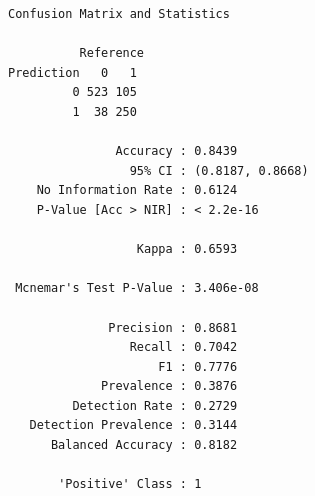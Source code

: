 \documentclass[
  letterpaper,
  DIV=11,
  numbers=noendperiod]{scrartcl}
\newenvironment{Shaded}{\begin{snugshade}}{\end{snugshade}}
\newcommand{\AttributeTok}[1]{\textcolor[rgb]{0.40,0.45,0.13}{#1}}
\newcommand{\FunctionTok}[1]{\textcolor[rgb]{0.28,0.35,0.67}{#1}}
\newcommand{\NormalTok}[1]{\textcolor[rgb]{0.00,0.23,0.31}{#1}}
\newcommand{\OtherTok}[1]{\textcolor[rgb]{0.00,0.23,0.31}{#1}}
\newcommand{\SpecialCharTok}[1]{\textcolor[rgb]{0.37,0.37,0.37}{#1}}
\newcommand{\StringTok}[1]{\textcolor[rgb]{0.13,0.47,0.30}{#1}}
\begin{document}
\begin{verbatim}
Confusion Matrix and Statistics

          Reference
Prediction   0   1
         0 523 105
         1  38 250
                                          
               Accuracy : 0.8439          
                 95% CI : (0.8187, 0.8668)
    No Information Rate : 0.6124          
    P-Value [Acc > NIR] : < 2.2e-16       
                                          
                  Kappa : 0.6593          
                                          
 Mcnemar's Test P-Value : 3.406e-08       
                                          
              Precision : 0.8681          
                 Recall : 0.7042          
                     F1 : 0.7776          
             Prevalence : 0.3876          
         Detection Rate : 0.2729          
   Detection Prevalence : 0.3144          
      Balanced Accuracy : 0.8182          
                                          
       'Positive' Class : 1               
                                          
\end{verbatim}

\begin{Shaded}
\end{Shaded}
\end{document}
